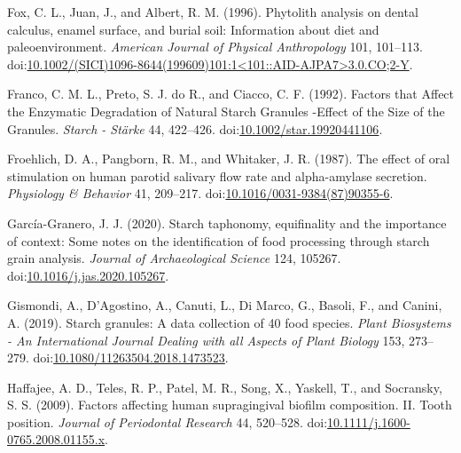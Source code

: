 \documentclass[utf8]{frontiers/frontiersSCNS}
\newlength{\cslhangindent}
\newlength{\cslentryspacingunit} %
\newenvironment{CSLReferences}[2] %
 {%
  \setlength{\parindent}{0pt}
  \ifodd #1
  \let\oldpar\par
  \def\par{\hangindent=\cslhangindent\oldpar}
  \fi
  \setlength{\parskip}{#2\cslentryspacingunit}
 }%
 {}
\begin{document}
\begin{CSLReferences}{1}{0}
\leavevmode{}%
Fox, C. L., Juan, J., and Albert, R. M. (1996). Phytolith analysis on dental calculus, enamel surface, and burial soil: {Information} about diet and paleoenvironment. \emph{American Journal of Physical Anthropology} 101, 101--113. doi:\href{https://doi.org/10.1002/(SICI)1096-8644(199609)101:1\%3C101::AID-AJPA7\%3E3.0.CO;2-Y}{10.1002/(SICI)1096-8644(199609)101:1\textless101::AID-AJPA7\textgreater3.0.CO;2-Y}.

\leavevmode{}%
Franco, C. M. L., Preto, S. J. do R., and Ciacco, C. F. (1992). Factors that {Affect} the {Enzymatic Degradation} of {Natural Starch Granules} -{Effect} of the {Size} of the {Granules}. \emph{Starch - Stärke} 44, 422--426. doi:\href{https://doi.org/10.1002/star.19920441106}{10.1002/star.19920441106}.

\leavevmode{}%
Froehlich, D. A., Pangborn, R. M., and Whitaker, J. R. (1987). The effect of oral stimulation on human parotid salivary flow rate and alpha-amylase secretion. \emph{Physiology \& Behavior} 41, 209--217. doi:\href{https://doi.org/10.1016/0031-9384(87)90355-6}{10.1016/0031-9384(87)90355-6}.

\leavevmode{}%
García-Granero, J. J. (2020). Starch taphonomy, equifinality and the importance of context: {Some} notes on the identification of food processing through starch grain analysis. \emph{Journal of Archaeological Science} 124, 105267. doi:\href{https://doi.org/10.1016/j.jas.2020.105267}{10.1016/j.jas.2020.105267}.

\leavevmode{}%
Gismondi, A., D'Agostino, A., Canuti, L., Di Marco, G., Basoli, F., and Canini, A. (2019). Starch granules: A data collection of 40 food species. \emph{Plant Biosystems - An International Journal Dealing with all Aspects of Plant Biology} 153, 273--279. doi:\href{https://doi.org/10.1080/11263504.2018.1473523}{10.1080/11263504.2018.1473523}.

\leavevmode{}%
Haffajee, A. D., Teles, R. P., Patel, M. R., Song, X., Yaskell, T., and Socransky, S. S. (2009). Factors affecting human supragingival biofilm composition. {II}. {Tooth} position. \emph{Journal of Periodontal Research} 44, 520--528. doi:\href{https://doi.org/10.1111/j.1600-0765.2008.01155.x}{10.1111/j.1600-0765.2008.01155.x}.


\end{CSLReferences}
\end{document}
